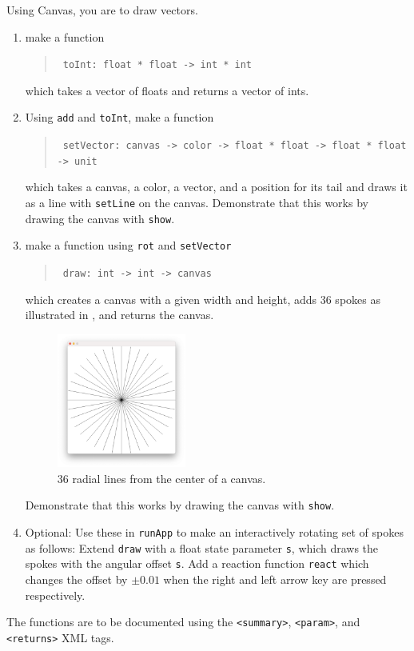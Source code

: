 Using Canvas, you are to draw vectors.
\begin{enumerate}
\item make a function
  \begin{quote}
    \mbox{\lstinline! toInt: float * float -> int * int!}
  \end{quote}
  which takes a vector of floats and returns a vector of ints.
\item Using \lstinline{add} and \lstinline{toInt}, make a function
  \begin{quote}
    \mbox{\lstinline! setVector: canvas -> color -> float * float -> float * float -> unit!}
  \end{quote}
  which takes a canvas, a color, a vector, and a position for its tail and draws it as a line with \lstinline{setLine} on the canvas. Demonstrate that this works by drawing the canvas with \lstinline{show}.
\item make a function using \lstinline{rot} and \lstinline{setVector}
  \begin{quote}
    \mbox{\lstinline! draw: int -> int -> canvas!}
  \end{quote}
  which creates a canvas with a given width and height, adds 36 spokes as illustrated in , and returns the canvas.
  \begin{figure}
    \centering
    \includegraphics[width=0.4\textwidth]{spokes}
    \caption{36 radial lines from the center of a canvas.}
    \label{fig:spokes}
  \end{figure}
  Demonstrate that this works by drawing the canvas with \lstinline{show}.
\item Optional: Use these in \lstinline{runApp} to make an interactively rotating set of spokes as follows: Extend \lstinline{draw} with a float state parameter \lstinline{s}, which draws the spokes with the angular offset \lstinline{s}. Add a reaction function \lstinline{react} which changes the offset by $\pm0.01$ when the right and left arrow key are pressed respectively.
\end{enumerate}
The functions are to be documented using the \verb|<summary>|, \verb|<param>|, and \verb|<returns>| XML tags.
